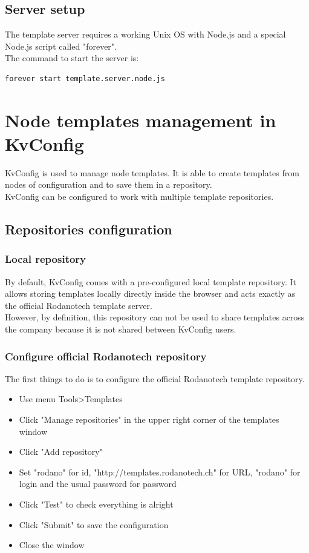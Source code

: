 \documentclass[11pt,a4paper,oneside]{article}
\begin{document}
\subsection{Server setup}
The template server requires a working Unix OS with Node.js and a special Node.js script called "forever".\\

The command to start the server is:
\begin{lstlisting}
forever start template.server.node.js
\end{lstlisting}

\section{Node templates management in KvConfig}
KvConfig is used to manage node templates. It is able to create templates from nodes of configuration and to save them in a repository.\\
KvConfig can be configured to work with multiple template repositories.

\subsection{Repositories configuration}

\subsubsection{Local repository}
By default, KvConfig comes with a pre-configured local template repository. It allows storing templates locally directly inside the browser and acts exactly as the official Rodanotech template server.\\
However, by definition, this repository can not be used to share templates across the company because it is not shared between KvConfig users.

\subsubsection{Configure official Rodanotech repository}

The first things to do is to configure the official Rodanotech template repository.\\
\begin{itemize}
	\item Use menu Tools\textgreater Templates
	\item Click "Manage repositories" in the upper right corner of the templates window
	\item Click "Add repository"
	\item Set "rodano" for id, "http://templates.rodanotech.ch" for URL, "rodano" for login and the usual password for password
	\item Click "Test" to check everything is alright
	\item Click "Submit" to save the configuration
	\item Close the window
\end{itemize}
\end{document}
